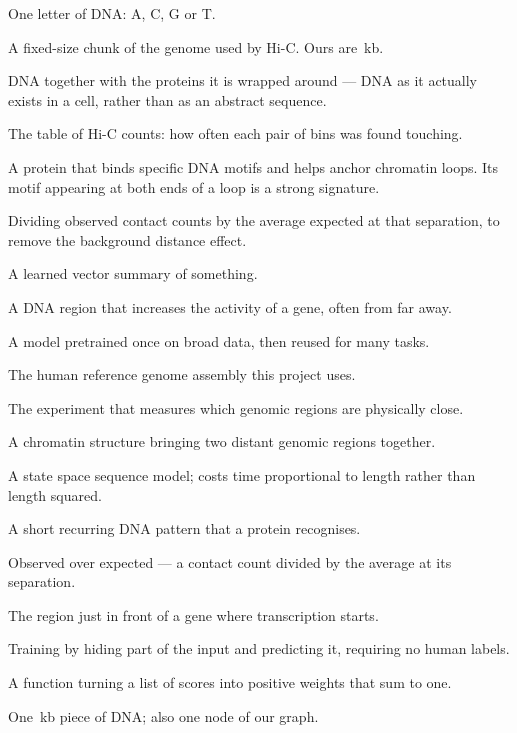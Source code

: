 \documentclass[11pt,a4paper]{article}
\begin{document}
\begin{description}[leftmargin=0pt, style=nextline, itemsep=3pt]
\item[Base / nucleotide] One letter of DNA: A, C, G or T.
\item[Bin] A fixed-size chunk of the genome used by Hi-C. Ours are \WEbinkb\,kb.
\item[Chromatin] DNA together with the proteins it is wrapped around --- DNA as it
  actually exists in a cell, rather than as an abstract sequence.
\item[Contact map] The table of Hi-C counts: how often each pair of bins was found
  touching.
\item[CTCF] A protein that binds specific DNA motifs and helps anchor chromatin
  loops. Its motif appearing at both ends of a loop is a strong signature.
\item[Detrending] Dividing observed contact counts by the average expected at that
  separation, to remove the background distance effect.
\item[Embedding] A learned vector summary of something.
\item[Enhancer] A DNA region that increases the activity of a gene, often from far
  away.
\item[Foundation model] A model pretrained once on broad data, then reused for many
  tasks.
\item[hg38] The human reference genome assembly this project uses.
\item[Hi-C] The experiment that measures which genomic regions are physically close.
\item[Loop] A chromatin structure bringing two distant genomic regions together.
\item[Mamba] A state space sequence model; costs time proportional to length rather
  than length squared.
\item[Motif] A short recurring DNA pattern that a protein recognises.
\item[O/E] Observed over expected --- a contact count divided by the average at its
  separation.
\item[Promoter] The region just in front of a gene where transcription starts.
\item[Self-supervised learning] Training by hiding part of the input and predicting
  it, requiring no human labels.
\item[Softmax] A function turning a list of scores into positive weights that sum
  to one.
\item[Window] One \WEbinkb\,kb piece of DNA; also one node of our graph.
\end{description}
\end{document}
